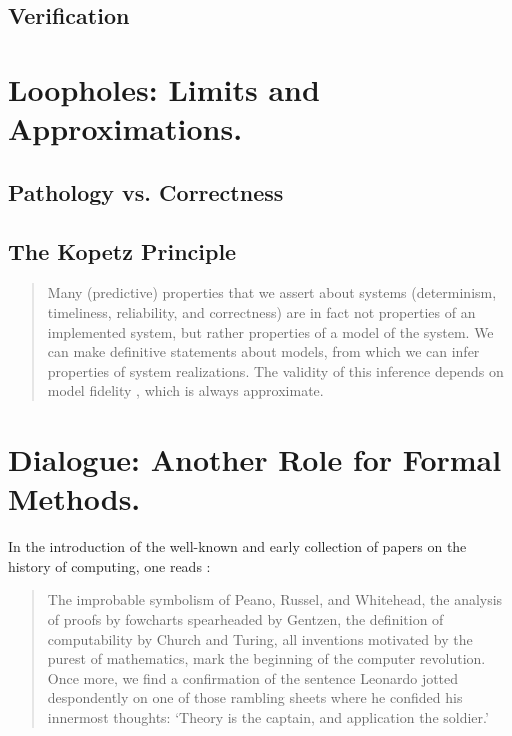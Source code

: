 \documentclass[]{article}
\begin{document}
\subsection{Verification}


{\color{red}{Note by Selmer on Different notions of Verification. Can he turn it into something that fits here?}}



\section{Loopholes: Limits and Approximations.}

\subsection{Pathology vs. Correctness}

{\color{red}{Liesbeth?}}



\subsection{The Kopetz Principle}%

{\color{red}{Passage inspired by Edgar}}


\begin{quote}
	Many (predictive) properties that we assert about systems (determinism, timeliness, reliability, and correctness) are in fact not properties of an implemented system, but rather properties of a model of	the system.
	We can make definitive statements about
	models, from which we can infer properties of system realizations. The validity of this inference depends on model fidelity , which is always approximate.
\end{quote}



\section{Dialogue: Another Role for Formal Methods.}

{\color{red}{Passage inspired by Liesbeth}}


In the introduction of the well-known and early collection of papers on the
history of computing, one reads \cite[p???]{??}:

\begin{quote}
The improbable symbolism of Peano, Russel, and Whitehead, the
analysis of proofs by fowcharts spearheaded by Gentzen, the definition of computability by Church and Turing, all inventions motivated by the purest of mathematics, mark the beginning of the computer revolution. Once more, we find a confirmation of the sentence Leonardo jotted despondently on one of those rambling sheets where he confided his innermost thoughts: `Theory is the captain,
and application the soldier.'
\end{quote}
\end{document}

